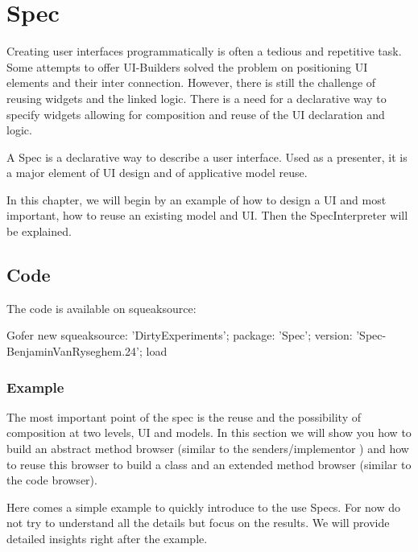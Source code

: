 \documentclass[a4paper,10pt,twoside]{book}
\begin{document}
\fi
\sloppy

\chapter{Spec}

Creating user interfaces programmatically is often a tedious and repetitive task. Some attempts to offer UI-Builders solved the problem on positioning UI elements and their inter connection. However, there is still the challenge of reusing widgets and the linked logic. There is a need for a declarative way to specify widgets allowing for composition and reuse of the UI declaration and logic. 

A Spec is a declarative way to describe a user interface. Used as a presenter, it is a major element of UI design and of applicative model reuse.

In this chapter, we will begin by an example of how to design a UI and most important, how to reuse an existing model and UI. Then the SpecInterpreter will be explained.

\section{Code}

The code is available on squeaksource:
\begin{code}{}
Gofer new
	squeaksource: 'DirtyExperiments';
	package: 'Spec';
	version: 'Spec-BenjaminVanRyseghem.24';
	load
\end{code}

\subsection{Example}

The most important point of the spec is the reuse and the possibility of composition at two levels, UI and models. In this section we will show you how to build an abstract method browser (similar to the senders/implementor ) and how to reuse this browser to build a class and an extended method browser (similar to the code browser).

Here comes a simple example to quickly introduce to the use Specs. For now do not try to understand all the details but focus on the results. We will provide detailed insights right after the example.
\end{document}
